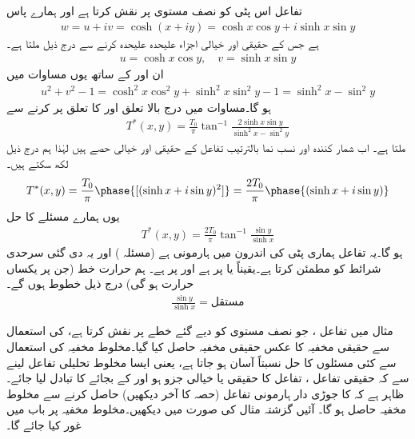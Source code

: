 تفاعل  اس پٹی کو نصف مستوی  پر نقش کرتا ہے اور  ہمارے پاس
\begin{align*}
w=u+iv=\cosh (x+iy)=\cosh x\cos y+i\sinh x\sin y
\end{align*}
ہے جس کے حقیقی اور خیالی اجزاء علیحدہ علیحدہ کرنے سے درج ذیل ملتا ہے۔
\begin{align*}
u=\cosh x\cos y,\quad v=\sinh x\sin y
\end{align*}
ان  اور  کے ساتھ یوں مساوات  میں
\begin{align*}
u^2+v^2-1=\cosh^2 x\cos^2 y+\sinh^2 x\sin^2 y-1=\sinh^2x-\sin^2y
\end{align*}
ہو گا۔مساوات  میں درج بالا تعلق اور  کا تعلق پر کرنے سے
\begin{align*}
T^*(x,y)=\frac{T_0}{\pi}\tan^{-1} \frac{2\sinh x\sin y}{\sinh^2 x-\sin^2 y}
\end{align*}
ملتا ہے۔ اب شمار کنندہ اور نسب نما بالترتیب تفاعل  کے  حقیقی اور خیالی حصے ہیں لہٰذا ہم درج ذیل لکھ سکتے ہیں۔
\begin{align*}
T^*(x,y)=\frac{T_0}{\pi} \phase{[(\sinh x+i\sin y)^2]}=\frac{2T_0}{\pi} \phase{(\sinh x+i\sin y)}
\end{align*}
یوں ہمارے مسئلے کا حل 
\begin{align}
T^*(x,y)=\frac{2T_0}{\pi} \tan^{-1} \frac{\sin y}{\sinh x}
\end{align}
ہو گا۔یہ تفاعل ہماری پٹی کی اندرون میں ہارمونی ہے (مسئلہ ) اور یہ دی گئی سرحدی شرائط کو مطمئن کرتا ہے۔یقیناً  یا  پر  ہے اور  پر  ہے۔ ہم حرارت خط (جن پر یکساں حرارت ہو گی) درج ذیل خطوط ہوں گے۔
\begin{align*}
\frac{\sin y}{\sinh x}=\text{مستقل}
\end{align*}

مثال  میں تفاعل ، جو نصف مستوی کو دیے گئے خطے پر نقش کرتا ہے، کی استعمال سے حقیقی مخفیہ   کا عکس حقیقی مخفیہ  حاصل کیا گیا۔مخلوط مخفیہ کی استعمال سے کئی مسئلوں کا حل نسبتاً آسان ہو جاتا ہے، یعنی ایسا مخلوط تحلیلی تفاعل  لینے سے  کہ حقیقی تفاعل ، تفاعل  کا حقیقی یا خیالی جزو ہو اور  کے بجائے  کا تبادل لیا جائے۔ظاہر ہے کہ  کا جوڑی دار ہارمونی تفاعل (حصہ  کا آخر دیکھیں) حاصل کرنے سے  مخلوط مخفیہ   حاصل ہو گا۔  آئیں    گزشتہ مثال کی صورت میں دیکھیں۔مخلوط مخفیہ پر  باب  میں غور کیا جائے گا۔

